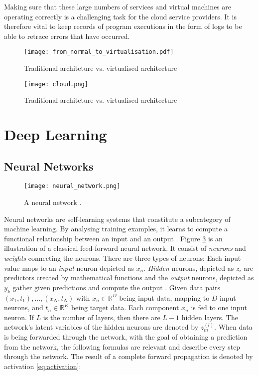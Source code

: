 Making sure that these large numbers of services and virtual machines are operating correctly is a challenging task for the cloud service providers. It is therefore vital to keep records of program executions in the form of logs to be able to retrace errors that have occurred.

\begin{figure}[h]
  \centering
  \texttt{[image: from\_normal\_to\_virtualisation.pdf]}\\
  \caption{Traditional architeture vs. virtualised architecture}
  \label{fig:virtualisation}
\end{figure}

\begin{figure}[h]
  \centering
  \texttt{[image: cloud.png]}\\
  \caption{Traditional architeture vs. virtualised architecture}
  \label{fig:cloud}
\end{figure}


\section{Deep Learning \label{sec:deep-learning}}
\subsection{Neural Networks \label{sec:neural-networks}}
\begin{figure}[h]
  \centering
  \texttt{[image: neural\_network.png]}\\
  \caption{A neural network \cite{hallmachinelearning}.}
  \label{fig:neural_network}
\end{figure}
Neural networks are self-learning systems that constitute a subcategory of machine learning. By analysing training examples, it learns to compute a functional relationship between an input and an output \cite{sibi2013analysis}. Figure \ref{fig:neural_network} is an illustration of a classical feed-forward neural network. It consist of \textit{neurons} and \textit{weights} connecting the neurons. There are three types of neurons: Each input value maps to an \textit{input} neuron depicted as $x_n$. \textit{Hidden} neurons, depicted as $z_i$ are predictors created by mathematical functions and the \textit{output} neurons, depicted as $y_k$ gather given predictions and compute the output \cite{hallmachinelearning}. Given data pairs $(x_1, t_1), ..., (x_N, t_N)$ with $x_n \in \mathbb{R}^D$ being input data, mapping to $D$ input neurons, and $t_n \in \mathbb{R}^K$ being target data. Each component $x_n$ is fed to one input neuron. If $L$ is the number of layers, then there are $L-1$ hidden layers. The network's latent variables of the hidden neurons are denoted by $z_m^{(l)}$. When data is being forwarded through the network, with the goal of obtaining a prediction from the network, the following formulas are relevant and describe every step through the network. The result of a complete forward propagation is denoted by activation \ref{eq:activation}:

